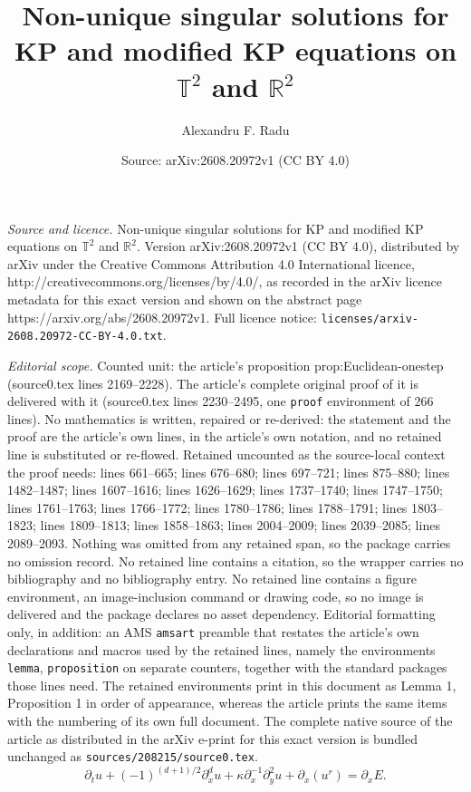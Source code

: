 \documentclass[10pt,a4paper]{amsart}
\title{Non-unique singular solutions for KP and modified KP equations on $\mathbb T^2$ and $\mathbb R^2$}
\author{Alexandru F. Radu}
\date{Source: arXiv:2608.20972v1 (CC BY 4.0)}
\begin{document}
\maketitle

\noindent\emph{Source and licence.} Non-unique singular solutions for KP and modified KP equations on $\mathbb T^2$ and $\mathbb R^2$. Version arXiv:2608.20972v1 (CC BY 4.0), distributed by arXiv under the Creative Commons Attribution 4.0 International licence, http://creativecommons.org/licenses/by/4.0/, as recorded in the arXiv licence metadata for this exact version and shown on the abstract page https://arxiv.org/abs/2608.20972v1. Full licence notice: \texttt{licenses/arxiv-2608.20972-CC-BY-4.0.txt}.\par\smallskip

\noindent\textit{Editorial scope.} Counted unit: the article's proposition prop:Euclidean-onestep (source0.tex lines 2169--2228). The article's complete original proof of it is delivered with it (source0.tex lines 2230--2495, one \texttt{proof} environment of 266 lines). No mathematics is written, repaired or re-derived: the statement and the proof are the article's own lines, in the article's own notation, and no retained line is substituted or re-flowed.  Retained uncounted as the source-local context the proof needs: lines 661--665; lines 676--680; lines 697--721; lines 875--880; lines 1482--1487; lines 1607--1616; lines 1626--1629; lines 1737--1740; lines 1747--1750; lines 1761--1763; lines 1766--1772; lines 1780--1786; lines 1788--1791; lines 1803--1823; lines 1809--1813; lines 1858--1863; lines 2004--2009; lines 2039--2085; lines 2089--2093.  Nothing was omitted from any retained span, so the package carries no omission record.  No retained line contains a citation, so the wrapper carries no bibliography and no bibliography entry.  No retained line contains a figure environment, an image-inclusion command or drawing code, so no image is delivered and the package declares no asset dependency.  Editorial formatting only, in addition: an AMS \texttt{amsart} preamble that restates the article's own declarations and macros used by the retained lines, namely the environments \texttt{lemma}, \texttt{proposition} on separate counters, together with the standard packages those lines need.  The retained environments print in this document as Lemma 1, Proposition 1 in order of appearance, whereas the article prints the same items with the numbering of its own full document.  The complete native source of the article as distributed in the arXiv e-print for this exact version is bundled unchanged as \texttt{sources/208215/source0.tex}.
\begin{equation}\label{eq:relaxed-general}
 \partial_tu+(-1)^{(d+1)/2}\partial_x^du
 +\kappa\partial_x^{-1}\partial_y^2u+\partial_x(u^r)
 =\partial_xE.
\end{equation}
\end{document}
